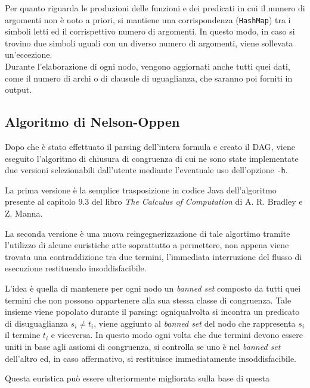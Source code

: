 \documentclass[a4paper,11pt]{article}
\begin{document}
\par
Per quanto riguarda le produzioni delle funzioni e dei predicati in cui 
il numero di argomenti non è noto a priori, si mantiene una corrispondenza 
(\texttt{HashMap}) tra i simboli letti ed il corrispettivo numero di 
argomenti. In questo modo, in caso si trovino due simboli uguali con un 
diverso numero di argomenti, viene sollevata un'eccezione.\\ 
Durante l'elaborazione di ogni nodo, vengono aggiornati anche tutti 
quei dati, come il numero di archi o di clausule di uguaglianza, che 
saranno poi forniti in output.
 
\subsection{Algoritmo di Nelson-Oppen}
Dopo che è stato effettuato il parsing dell'intera formula e creato il 
DAG, viene eseguito l'algoritmo di chiusura di congruenza di cui ne 
sono state implementate due versioni selezionabili dall'utente 
mediante l'eventuale uso dell'opzione \texttt{-h}.\par
La prima versione è la semplice trasposizione in codice Java 
dell'algoritmo presente al capitolo 9.3 del libro \emph{The Calculus 
of Computation} di A. R. Bradley e Z. Manna.\par
La seconda versione è una nuova reingegnerizzazione di tale algortimo 
tramite l'utilizzo di alcune euristiche atte soprattutto a permettere, 
non appena viene trovata una contraddizione tra due termini, l'immediata 
interruzione del flusso di esecuzione restituendo insoddisfacibile.\par
L'idea è quella di mantenere per ogni nodo un \emph{banned set} 
composto da tutti quei termini che non possono appartenere alla sua 
stessa classe di congruenza. Tale insieme viene popolato durante il 
parsing: ogniqualvolta si incontra un predicato di disuguaglianza 
$s_{i} \not= t_{i}$, viene aggiunto al \emph{banned set} del nodo che 
rappresenta $s_{i}$ il termine $t_{i}$ e viceversa. 
In questo modo ogni volta che due termini devono essere uniti in base 
agli assiomi di congruenza, si controlla se uno è nel \emph{banned 
set} dell'altro ed, in caso affermativo, si restituisce immediatamente 
insoddisfacibile. \par
Questa euristica può essere ulteriormente migliorata sulla base di questa 
\end{document}
